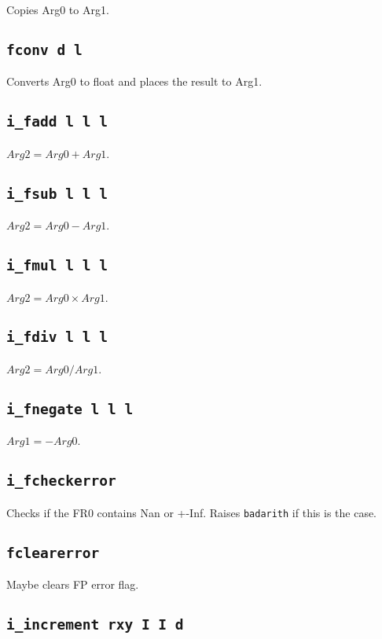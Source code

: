 \documentclass{article}
\newcommand{\iop}[1]{\texttt{#1}}
\begin{document}
Copies Arg0 to Arg1.

\subsection*{\iop{fconv d l}}

Converts Arg0 to float and places the result to Arg1.

\subsection*{\iop{i\_fadd l l l}}

$Arg2 = Arg0 + Arg1$.

\subsection*{\iop{i\_fsub l l l}}

$Arg2 = Arg0 - Arg1$.

\subsection*{\iop{i\_fmul l l l}}

$Arg2 = Arg0 \times Arg1$.

\subsection*{\iop{i\_fdiv l l l}}

$Arg2 = Arg0 / Arg1$.

\subsection*{\iop{i\_fnegate l l l}}

$Arg1 = -Arg0$.

\subsection*{\iop{i\_fcheckerror}}

Checks if the FR0 contains Nan or +-Inf. Raises \verb$badarith$ if this is the
case.

\subsection*{\iop{fclearerror}}

Maybe clears FP error flag.

\subsection*{\iop{i\_increment rxy I I d}}
\end{document}
